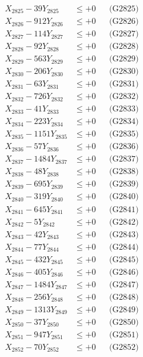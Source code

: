 \documentclass[a4paper,10pt]{article}
\begin{document}
{\begin{align}
X_{2825} - 39Y_{2825} &\leq +0 && \text{(G2825)} \\
X_{2826} - 912Y_{2826} &\leq +0 && \text{(G2826)} \\
X_{2827} - 114Y_{2827} &\leq +0 && \text{(G2827)} \\
X_{2828} - 92Y_{2828} &\leq +0 && \text{(G2828)} \\
X_{2829} - 563Y_{2829} &\leq +0 && \text{(G2829)} \\
X_{2830} - 206Y_{2830} &\leq +0 && \text{(G2830)} \\
\allowbreak
X_{2831} - 63Y_{2831} &\leq +0 && \text{(G2831)} \\
X_{2832} - 726Y_{2832} &\leq +0 && \text{(G2832)} \\
X_{2833} - 41Y_{2833} &\leq +0 && \text{(G2833)} \\
X_{2834} - 223Y_{2834} &\leq +0 && \text{(G2834)} \\
X_{2835} - 1151Y_{2835} &\leq +0 && \text{(G2835)} \\
X_{2836} - 57Y_{2836} &\leq +0 && \text{(G2836)} \\
X_{2837} - 1484Y_{2837} &\leq +0 && \text{(G2837)} \\
X_{2838} - 48Y_{2838} &\leq +0 && \text{(G2838)} \\
X_{2839} - 695Y_{2839} &\leq +0 && \text{(G2839)} \\
X_{2840} - 319Y_{2840} &\leq +0 && \text{(G2840)} \\
\allowbreak
X_{2841} - 645Y_{2841} &\leq +0 && \text{(G2841)} \\
X_{2842} - 5Y_{2842} &\leq +0 && \text{(G2842)} \\
X_{2843} - 42Y_{2843} &\leq +0 && \text{(G2843)} \\
X_{2844} - 77Y_{2844} &\leq +0 && \text{(G2844)} \\
X_{2845} - 432Y_{2845} &\leq +0 && \text{(G2845)} \\
X_{2846} - 405Y_{2846} &\leq +0 && \text{(G2846)} \\
X_{2847} - 1484Y_{2847} &\leq +0 && \text{(G2847)} \\
X_{2848} - 256Y_{2848} &\leq +0 && \text{(G2848)} \\
X_{2849} - 1313Y_{2849} &\leq +0 && \text{(G2849)} \\
X_{2850} - 37Y_{2850} &\leq +0 && \text{(G2850)} \\
\allowbreak
X_{2851} - 947Y_{2851} &\leq +0 && \text{(G2851)} \\
X_{2852} - 70Y_{2852} &\leq +0 && \text{(G2852)} \\

\end{align}}
\end{document}
